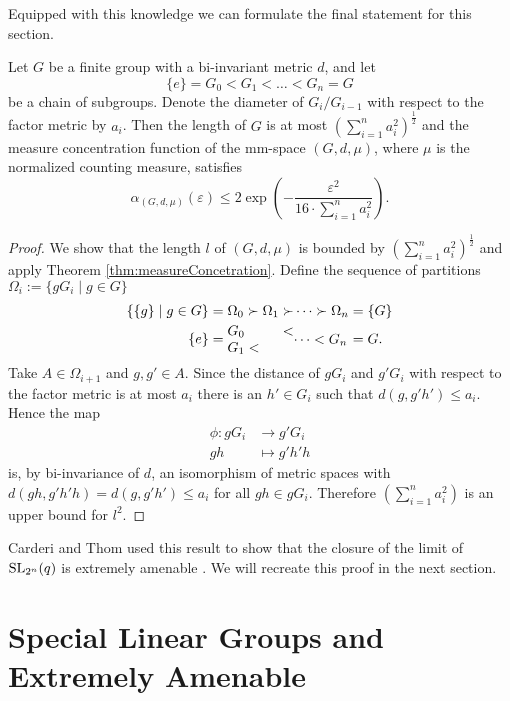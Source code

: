 Equipped with this knowledge we can formulate the final statement for this section. 
\begin{corollary}\label{cor:meaContractionGroups}
Let $G$ be a finite group with a bi-invariant metric $d$, and let
\[\{e\}=G_0<G_1<\dots <G_n=G\]
be a chain of subgroups. Denote the diameter of $G_i/G_{i-1}$ with respect to the factor metric by $a_i$. Then the length of $G$ is at most $\left(\sum_{i=1}^{n}a_i^2\right)^{\frac{1}{2}}$ and the measure concentration function of the mm-space $(G,d,\mu)$, where $\mu$ is the normalized counting measure, satisfies
\[\alpha_{(G,d,\mu)}(\varepsilon)\leq 2\exp\left(-\frac{\varepsilon^2}{16\cdot\sum_{i=1}^{n}a_i^2}\right).\]
\end{corollary}
\begin{proof}
We show that the length $l$ of $(G,d,\mu)$ is bounded by $\left(\sum_{i=1}^{n}a_i^2\right)^{\frac{1}{2}}$ and apply Theorem \ref{thm:measureConcetration}. Define the sequence of partitions $\Omega_i:=\{g G_i\mid g\in G\}$
\begin{align*}
\{\{g\}\mid g\in G\}=\Omega_0\succ\Omega_1\succ&\dots\succ\Omega_n=\{G\}\\
\{e\}=\parbox{\widthof{$\Omega_0\succ\Omega_1\succ$}}{$G_0<G_1<$}&\parbox{\widthof{${}\dots\succ\Omega_n$}}{$\dots <G_n$}=G.
\end{align*}
Take $A\in \Omega_{i+1}$ and $g,g'\in A$. Since the distance of $gG_i$ and $g'G_i$ with respect to the factor metric is at most $a_i$ there is an $h'\in G_i$ such that $d(g,g'h')\leq a_i$. Hence the map 
\begin{align*}
\phi\colon g G_i&{}\to g'G_i\\
gh&{}\mapsto g'h'h
\end{align*}
is, by bi-invariance of $d$, an isomorphism of metric spaces with $d(gh,g'h'h)=d(g,g'h')\leq a_i$ for all $gh\in gG_i$.
Therefore $\left(\sum_{i=1}^{n}a_i^2\right)$ is an upper bound for $l^2$. 
\end{proof}
Carderi and Thom used this result to show that the closure of the limit of $\operatorname{SL}_{2^n}(q)$ is extremely amenable \cite{thom}. We will recreate this proof in the next section. 


\section{Special Linear Groups and Extremely Amenable}\label{sec:thom}

